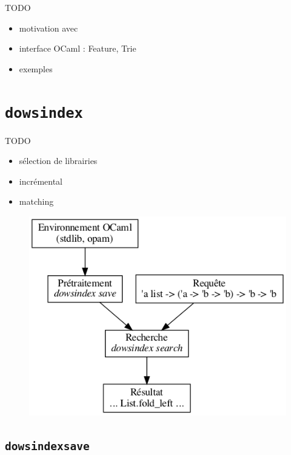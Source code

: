 \documentclass[a4paper]{report}
\theoremstyle{definition}
\newcommand{\dowsindex}{\texttt{dowsindex}\xspace}
\begin{document}
TODO
\begin{itemize}
	\item motivation avec \cite{Schulz}
	\item interface OCaml : Feature, Trie
	\item exemples
\end{itemize}


\chapter{\dowsindex}

TODO
\begin{itemize}
	\item sélection de librairies
	\item incrémental
	\item matching
\end{itemize}

\begin{figure}[h]
\begin{center}
	\includegraphics[scale=0.35]{graphs/dowsindex}
\end{center}
\end{figure}


\section{\dowsindex \texttt{save}}
\end{document}

